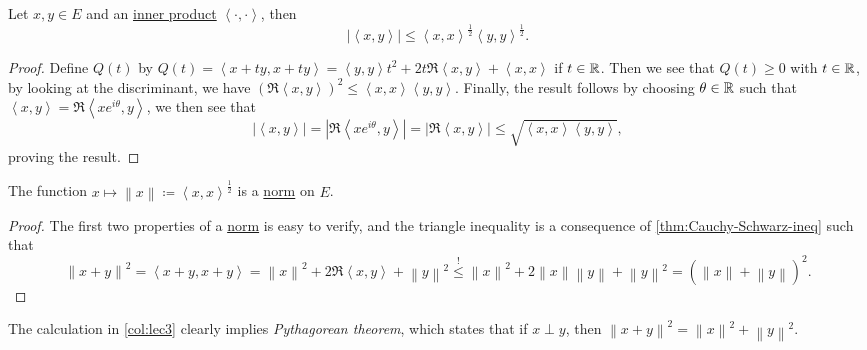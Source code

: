 \begin{theorem}\label{thm:Cauchy-Schwarz-ineq}
	Let \(x, y\in E\) and an \hyperref[def:inner-product]{inner product} \(\left\langle \cdot, \cdot \right\rangle \), then
	\[
		\left\vert \left\langle x, y \right\rangle  \right\vert \leq \left\langle x, x \right\rangle ^{\frac{1}{2}}\left\langle y, y \right\rangle ^{\frac{1}{2}}.
	\]
\end{theorem}
\begin{proof}
	Define \(Q(t)\) by \(Q(t) = \left\langle x+ty, x+ty \right\rangle = \left\langle y, y \right\rangle t^{2} + 2t \Re\left\langle x, y \right\rangle + \left\langle x,x \right\rangle\) if \(t\in \mathbb{\MakeUppercase{r}} \). Then we see that \(Q(t) \geq 0\) with \(t\in \mathbb{\MakeUppercase{r}} \), by looking at the discriminant, we have \((\Re\left\langle x, y \right\rangle) ^{2} \leq \left\langle x, x \right\rangle \left\langle y, y \right\rangle\). Finally, the result follows by choosing \(\theta \in \mathbb{\MakeUppercase{r}} \) such that \(\left\langle x, y \right\rangle = \Re\left\langle x e^{i\theta}, y \right\rangle\), we then see that
	\[
		\left\vert \left\langle x, y \right\rangle  \right\vert = \left\vert \Re \left\langle x e^{i \theta }, y \right\rangle  \right\vert = \left\vert \Re \left\langle x, y \right\rangle  \right\vert \leq \sqrt{\left\langle x, x \right\rangle \left\langle y, y \right\rangle },
	\]
	proving the result.
\end{proof}

\begin{corollary}\label{col:lec3}
	The function \(x\mapsto \left\lVert x\right\rVert \coloneqq \left\langle x, x \right\rangle ^{\frac{1}{2}}\) is a \hyperref[def:norm]{norm} on \(E\).
\end{corollary}
\begin{proof}
	The first two properties of a \hyperref[def:norm]{norm} is easy to verify, and the triangle inequality is a consequence of \autoref{thm:Cauchy-Schwarz-ineq} such that
	\[
		\left\lVert x+y\right\rVert ^{2} = \left\langle x+y, x+y \right\rangle = \left\lVert x\right\rVert ^{2} + 2\Re\left\langle x, y \right\rangle + \left\lVert y\right\rVert ^{2} \overset{\hyperref[thm:Cauchy-Schwarz-ineq]{\text{!}}}{\leq} \left\lVert x\right\rVert ^{2} + 2\left\lVert x\right\rVert \left\lVert y\right\rVert + \left\lVert y\right\rVert ^{2} = (\left\lVert x\right\rVert + \left\lVert y\right\rVert) ^{2} .
	\]
\end{proof}

\begin{remark}\label{rmk:Pythagorean-theorem}
	The calculation in \autoref{col:lec3} clearly implies \emph{Pythagorean theorem}, which states that if \(x \perp y\), then \(\left\lVert x + y\right\rVert ^{2} = \left\lVert x\right\rVert ^{2} + \left\lVert y\right\rVert ^{2} \).
\end{remark}

